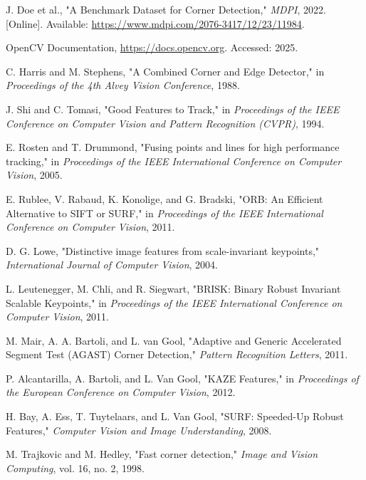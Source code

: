 \documentclass[journal]{IEEEtran}
\begin{document}
\begin{thebibliography}{1}

    J. Doe et al., "A Benchmark Dataset for Corner Detection," \textit{MDPI}, 2022. [Online]. Available: \url{https://www.mdpi.com/2076-3417/12/23/11984}.
    
    OpenCV Documentation, \url{https://docs.opencv.org}. Accessed: 2025.

    C. Harris and M. Stephens, "A Combined Corner and Edge Detector," in \textit{Proceedings of the 4th Alvey Vision Conference}, 1988.
    
    J. Shi and C. Tomasi, "Good Features to Track," in \textit{Proceedings of the IEEE Conference on Computer Vision and Pattern Recognition (CVPR)}, 1994.
    
    E. Rosten and T. Drummond, "Fusing points and lines for high performance tracking," in \textit{Proceedings of the IEEE International Conference on Computer Vision}, 2005.
    
    E. Rublee, V. Rabaud, K. Konolige, and G. Bradski, "ORB: An Efficient Alternative to SIFT or SURF," in \textit{Proceedings of the IEEE International Conference on Computer Vision}, 2011.

    D. G. Lowe, "Distinctive image features from scale-invariant keypoints," \textit{International Journal of Computer Vision}, 2004.

    L. Leutenegger, M. Chli, and R. Siegwart, "BRISK: Binary Robust Invariant Scalable Keypoints," in \textit{Proceedings of the IEEE International Conference on Computer Vision}, 2011.

    M. Mair, A. A. Bartoli, and L. van Gool, "Adaptive and Generic Accelerated Segment Test (AGAST) Corner Detection," \textit{Pattern Recognition Letters}, 2011.
    
    P. Alcantarilla, A. Bartoli, and L. Van Gool, "KAZE Features," in \textit{Proceedings of the European Conference on Computer Vision}, 2012.

    H. Bay, A. Ess, T. Tuytelaars, and L. Van Gool, "SURF: Speeded-Up Robust Features," \textit{Computer Vision and Image Understanding}, 2008.
    
    M. Trajkovic and M. Hedley, "Fast corner detection," \textit{Image and Vision Computing}, vol. 16, no. 2, 1998.

\end{thebibliography}
\end{document}
